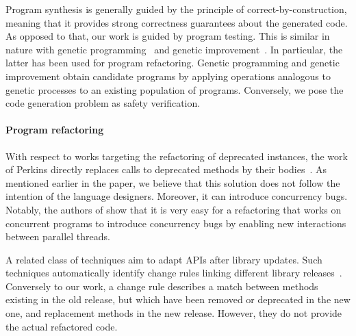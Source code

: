 \documentclass[10pt,conference]{IEEEtran}
\begin{document}

Program synthesis is generally guided by the principle of correct-by-construction, meaning that it provides strong correctness guarantees about the generated code.
As opposed to that, our work is guided by program testing. This is similar in nature with genetic programming~\cite{Koza92} and genetic improvement~\cite{DBLP:journals/dagstuhl-reports/PetkeGFL18,7911210}. In particular, the latter has been used for program refactoring. Genetic programming and genetic improvement obtain candidate programs by applying operations analogous to genetic processes to an existing population of programs. Conversely, we pose the code generation problem as safety verification.





\paragraph{Program refactoring}

With respect to works targeting the refactoring of deprecated instances, the work of Perkins directly replaces calls to deprecated methods by their bodies~\cite{DBLP:conf/paste/Perkins05}.
As mentioned earlier in the paper, we believe that this solution does not follow the intention of the language designers. Moreover, it can
introduce concurrency bugs. Notably, the authors of \cite{10.1007/978-3-642-14107-2_11}
show that it is very easy for a refactoring that works on concurrent
programs to introduce concurrency bugs by enabling new interactions between
parallel threads. %

A related class of techniques aim to adapt APIs after library updates. Such techniques
automatically identify change rules linking different library releases~\cite{DBLP:conf/icse/WuGAK10,DBLP:conf/kbse/Huang0PW021}. Conversely to our work, a change rule describes a match between methods existing in the old release, but which have been removed or deprecated in the new
one, and replacement methods in the new release. However, they do not provide the actual refactored code.
\end{document}
